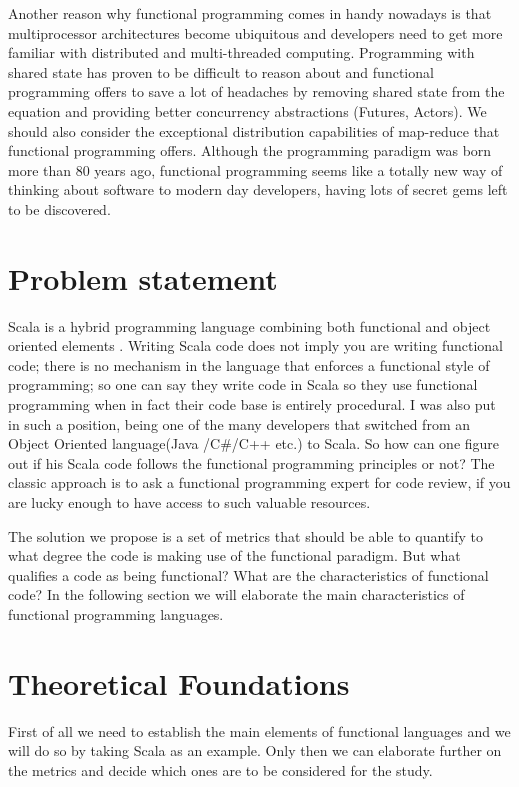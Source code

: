 \documentclass{article}
\begin{document}
Another reason why functional programming comes in handy nowadays is that multiprocessor architectures become ubiquitous and developers need to get more familiar with distributed and multi-threaded computing. Programming with shared state has proven to be  difficult to reason about and functional programming offers to save a lot of headaches by removing shared state from the equation and providing better concurrency abstractions (Futures, Actors). We should also consider  the exceptional distribution capabilities of map-reduce that functional programming offers. Although the programming paradigm was born more than 80 years ago, functional programming seems like a totally new way of thinking about software to modern day developers, having lots of secret gems left to be discovered. \par

\section {Problem statement}
Scala is a hybrid programming language combining both  functional and  object oriented elements \cite{scalalang:1}. Writing Scala code does not imply you are writing functional code;  there is no mechanism in the language that enforces a functional style of programming; so one can say they write code in Scala so they use functional programming when in fact their code base is entirely procedural. I was also put in such a position,  being one of the many  developers that switched from an Object Oriented language(Java /C\#/C++ etc.)  to Scala. So how can one figure out if his Scala code follows the functional programming principles or not? The classic approach is to ask a functional programming expert for code review, if you are lucky enough to have access to such valuable resources. \par

The solution we propose is a set of metrics that should be able to quantify to what degree the code is making use of the functional paradigm. But what  qualifies a code as being functional? What are the characteristics of functional code? In the following section we will elaborate the main characteristics of functional programming languages.\par


\section {Theoretical Foundations}
First of all we need to establish the main elements of functional languages and we will do so by taking Scala as an example. Only then we can elaborate further on the metrics and decide which ones are to be considered for the study. \par
\end{document}
